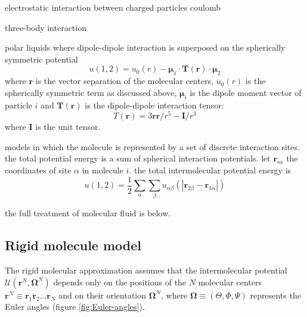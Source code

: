 electrostatic interaction between charged particles coulomb

three-body interaction

polar liquids where dipole-dipole interaction is superposed on the
spherically symmetric potential
\begin{equation}
u(1,2)=u_{0}(r)-\boldsymbol{\mu}_{1}\cdot\mathbf{T}(\mathbf{r})\cdot\boldsymbol{\mu}_{2}
\end{equation}
where $\mathbf{r}$ is the vector separation of the molecular centers,
$u_{0}(r)$ is the spherically symmetric term as discussed above,
$\boldsymbol{\mu}_{i}$ is the dipole moment vector of particle $i$
and $\mathbf{T}(\mathbf{r})$ is the dipole-dipole interaction tensor:
\begin{equation}
T(\mathbf{r})=3\mathbf{r}\mathbf{r}/r^{5}-\mathbf{I}/r^{3}
\end{equation}
where $\mathbf{I}$ is the unit tensor.

models in which the molecule is represented by a set of discrete interaction
sites. the total potential energy is a sum of spherical interaction
potentials. let $\mathbf{r}_{i\alpha}$ the coordinates of site $\alpha$
in molecule $i$. the total intermolecular potential energy is
\begin{equation}
u(1,2)=\frac{1}{2}\sum_{\alpha}\sum_{\beta}u_{\alpha\beta}(\left|\mathbf{r}_{2\beta}-\mathbf{r}_{1\alpha}\right|)
\end{equation}


the full treatment of molecular fluid is below.


\subsection{Rigid molecule model}

The rigid molecular approximation assumes that the intermolecular
potential $\mathcal{U}(\mathbf{r}^{N},\mathbf{\Omega}^{N})$ depends
only on the positions of the $N$ molecular centers $\mathbf{r}^{N}\equiv\mathbf{r}_{1}\mathbf{r}_{2}\ldots\mathbf{r}_{N}$
and on their orientation $\mathbf{\Omega}^{N}$, where $\mathbf{\Omega}\equiv(\Theta,\Phi,\Psi)$
represents the Euler angles (figure \ref{fig:Euler-angles}).

